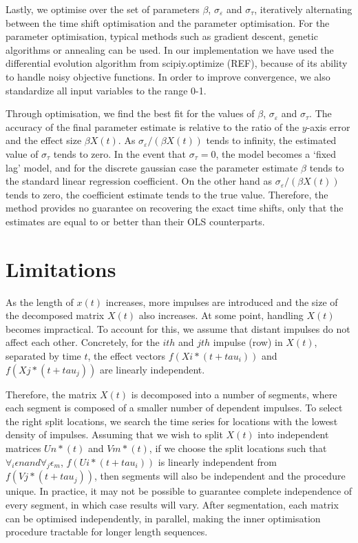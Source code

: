 \documentclass[11pt]{amsart}
\begin{document}
Lastly, we optimise over the set of parameters $\beta$, $\sigma_{\varepsilon}$ and $\sigma_{\tau}$, iteratively alternating between the time shift optimisation and the parameter optimisation. For the parameter optimisation, typical methods such as gradient descent, genetic algorithms or annealing can be used.  In our implementation we have used the differential evolution algorithm from scipiy.optimize (REF), because of its ability to handle noisy objective functions. In order to improve convergence, we also standardize all input variables to the range 0-1.

Through optimisation, we find the best fit for the values of $\beta$, $\sigma_{\varepsilon}$ and $\sigma_{\tau}$. The accuracy of the final parameter estimate is relative to the ratio of the $y$-axis error and the effect size $\beta X(t)$. As $\sigma_{\varepsilon}/(\beta X(t))$ tends to infinity, the estimated value of $\sigma_{\tau}$ tends to zero. In the event that $\sigma_{\tau}=0$, the model becomes a ‘fixed lag’ model, and for the discrete gaussian case the parameter estimate $\beta$ tends to the standard linear regression coefficient.
On the other hand as $\sigma_{\varepsilon}/(\beta X(t))$ tends to zero, the coefficient estimate tends to the true value. Therefore, the method provides no guarantee on recovering the exact time shifts, only that the estimates are equal to or better than their OLS counterparts.

\section{Limitations}
As the length of $x(t)$ increases, more impulses are introduced and the size of the decomposed matrix $X(t)$ also increases. At some point, handling $X(t)$ becomes impractical. To account for this, we assume that distant impulses do not affect each other. Concretely, for the $ith$ and $jth$ impulse (row) in $X(t)$, separated by time $t$, the effect vectors $f(Xi*(t + tau_i))$ and $f(Xj*(t + tau_j))$ are linearly independent.

Therefore, the matrix $X(t)$ is decomposed into a number of segments, where each segment is 
composed of a smaller number of dependent impulses. To select the right split locations, we search the time series for locations with the lowest density of impulses. Assuming that we wish to split $X(t)$ into independent matrices $Un*(t)$ and $Vm*(t)$, if we choose the split locations such that $\forall_i \epsilon n and  \forall_j \epsilon_ m$, $f(Ui*(t + tau_i))$ is linearly independent from $f(Vj*(t + tau_j))$, then segments will also be independent and the procedure unique. In practice, it may not be possible to guarantee complete independence of every segment, in which case results will vary. After segmentation, each matrix can be optimised independently, in parallel, making the inner optimisation procedure tractable for longer length sequences. 
\end{document}
